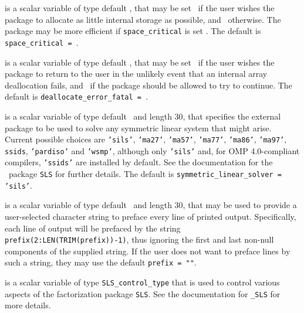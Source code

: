 \documentclass{galahad}
\begin{document}
\begin{description}
 is a scalar variable of type default \logical, that
may be set \true\ if the user wishes the package to allocate as little
internal storage as possible, and \false\ otherwise. The package may
be more efficient if {\tt space\_critical} is set \false.
The default is {\tt space\_critical = \false}.

 is a scalar variable of type default \logical,
that may be set \true\ if the user wishes the package to return to the user
in the unlikely event that an internal array deallocation fails,
and \false\ if the package should be allowed to try to continue.
The default is {\tt deallocate\_error\_fatal = \false}.

 is a scalar variable of type default \character\
and length 30, that specifies the external package to be used to
solve any symmetric linear system that might arise. Current possible
choices are {\tt 'sils'}, {\tt 'ma27'}, {\tt 'ma57'}, {\tt 'ma77'},
{\tt 'ma86'}, {\tt 'ma97'}, {\tt ssids}, {\tt 'pardiso'}
and {\tt 'wsmp'},
although only {\tt 'sils'} and, for OMP 4.0-compliant compilers,
{\tt 'ssids'} are installed by default.
See the documentation for the \galahad\ package {\tt SLS} for further details.
The default is {\tt symmetric\_linear\_solver = 'sils'}.

 is a scalar variable of type default \character\
and length 30, that may be used to provide a user-selected
character string to preface every line of printed output.
Specifically, each line of output will be prefaced by the string
{\tt prefix(2:LEN(TRIM(prefix))-1)},
thus ignoring the first and last non-null components of the
supplied string. If the user does not want to preface lines by such
a string, they may use the default {\tt prefix = ""}.

 is a scalar variable of type
{\tt SLS\_control\_type} that is used to control various aspects of the
factorization package {\tt SLS}. See the documentation for
{\tt \libraryname\_SLS} for more details.

\end{description}

\end{document}
